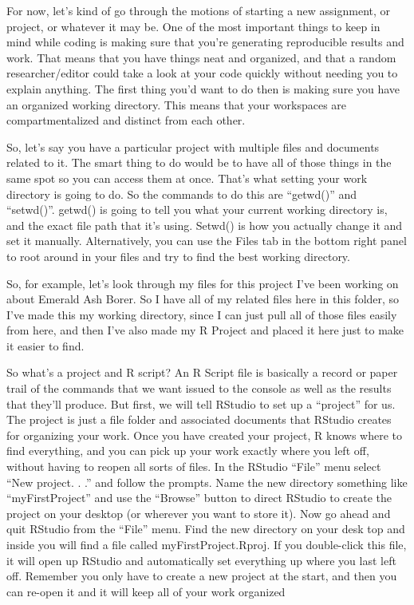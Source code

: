\documentclass[
]{article}
\begin{document}
For now, let's kind of go through the motions of starting a new
assignment, or project, or whatever it may be. One of the most important
things to keep in mind while coding is making sure that you're
generating reproducible results and work. That means that you have
things neat and organized, and that a random researcher/editor could
take a look at your code quickly without needing you to explain
anything. The first thing you'd want to do then is making sure you have
an organized working directory. This means that your workspaces are
compartmentalized and distinct from each other.

So, let's say you have a particular project with multiple files and
documents related to it. The smart thing to do would be to have all of
those things in the same spot so you can access them at once. That's
what setting your work directory is going to do. So the commands to do
this are ``getwd()'' and ``setwd()''. getwd() is going to tell you what
your current working directory is, and the exact file path that it's
using. Setwd() is how you actually change it and set it manually.
Alternatively, you can use the Files tab in the bottom right panel to
root around in your files and try to find the best working directory.

So, for example, let's look through my files for this project I've been
working on about Emerald Ash Borer. So I have all of my related files
here in this folder, so I've made this my working directory, since I can
just pull all of those files easily from here, and then I've also made
my R Project and placed it here just to make it easier to find.

So what's a project and R script? An R Script file is basically a record
or paper trail of the commands that we want issued to the console as
well as the results that they'll produce. But first, we will tell
RStudio to set up a ``project'' for us. The project is just a file
folder and associated documents that RStudio creates for organizing your
work. Once you have created your project, R knows where to find
everything, and you can pick up your work exactly where you left off,
without having to reopen all sorts of files. In the RStudio ``File''
menu select ``New project. . .'' and follow the prompts. Name the new
directory something like ``myFirstProject'' and use the ``Browse''
button to direct RStudio to create the project on your desktop (or
wherever you want to store it). Now go ahead and quit RStudio from the
``File'' menu. Find the new directory on your desk top and inside you
will find a file called myFirstProject.Rproj. If you double-click this
file, it will open up RStudio and automatically set everything up where
you last left off. Remember you only have to create a new project at the
start, and then you can re-open it and it will keep all of your work
organized
\end{document}
